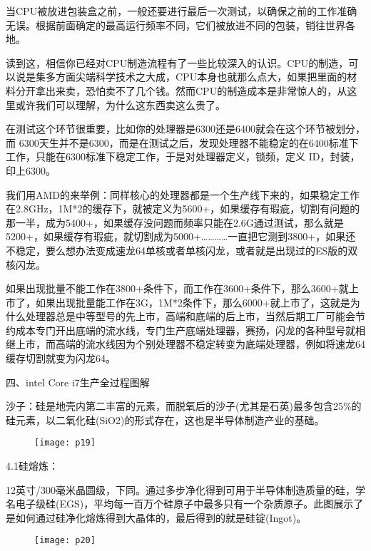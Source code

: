 \documentclass[utf8]{book}
\begin{document}
	当CPU被放进包装盒之前，一般还要进行最后一次测试，以确保之前的工作准确无误。根据前面确定的最高运行频率不同，它们被放进不同的包装，销往世界各地。
	
	读到这，相信你已经对CPU制造流程有了一些比较深入的认识。CPU的制造，可以说是集多方面尖端科学技术之大成，CPU本身也就那么点大，如果把里面的材料分开拿出来卖，恐怕卖不了几个钱。然而CPU的制造成本是非常惊人的，从这里或许我们可以理解，为什么这东西卖这么贵了。
	
	在测试这个环节很重要，比如你的处理器是6300还是6400就会在这个环节被划分，而 6300天生并不是6300，而是在测试之后，发现处理器不能稳定的在6400标准下工作，只能在6300标准下稳定工作，于是对处理器定义，锁频，定义 ID，封装，印上6300。
	
	我们用AMD的来举例：同样核心的处理器都是一个生产线下来的，如果稳定工作在2.8GHz，1M*2的缓存下，就被定义为5600+，如果缓存有瑕疵，切割有问题的那一半，成为5400+，如果缓存没问题而频率只能在2.6G通过测试，那么就是5200+，如果缓存有瑕疵，就切割成为5000+…………一直把它测到3800+，如果还不稳定，要么想办法变成速龙64单核或者单核闪龙，或者就是出现过的ES版的双核闪龙。
	
	如果出现批量不能工作在3800+条件下，而工作在3600+条件下，那么3600+就上市了，如果出现批量能工作在3G，1M*2条件下，那么6000+就上市了，这就是为什么处理器总是中等型号的先上市，高端和底端的后上市，当然后期工厂可能会节约成本专门开出底端的流水线，专门生产底端处理器，赛扬，闪龙的各种型号就相继上市，而高端的流水线因为个别处理器不稳定转变为底端处理器，例如将速龙64缓存切割就变为闪龙64。
	
	四、intel Core i7生产全过程图解
	
	沙子：硅是地壳内第二丰富的元素，而脱氧后的沙子(尤其是石英)最多包含25\%的硅元素，以二氧化硅(SiO2)的形式存在，这也是半导体制造产业的基础。
	
	\begin{figure}[H]
		\centering
		\texttt{[image: p19]}
	\end{figure}
	
	
	4.1硅熔炼：
	
	12英寸/300毫米晶圆级，下同。通过多步净化得到可用于半导体制造质量的硅，学名电子级硅(EGS)，平均每一百万个硅原子中最多只有一个杂质原子。此图展示了是如何通过硅净化熔炼得到大晶体的，最后得到的就是硅锭(Ingot)。
	
	\begin{figure}[H]
		\centering
		\texttt{[image: p20]}
	\end{figure}
	
\end{document}
